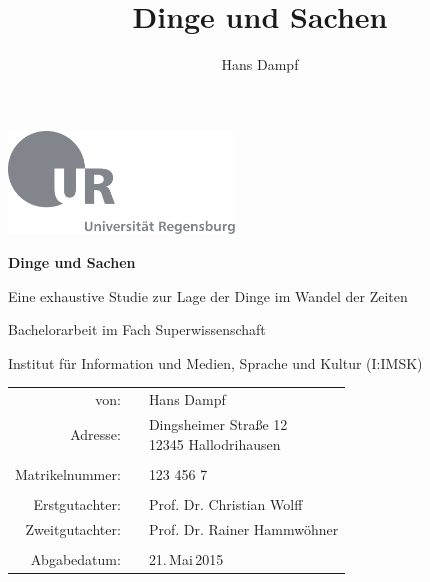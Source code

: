 \documentclass[12pt,ngerman,a4paper,DIV=9,headinclude=true,footinclude=false,titlepage=true,headsepline=true,toc=bibliography,toc=listof]{scrartcl}
\title{Dinge und Sachen\\\vspace{0.5em}{\large Eine exhaustive Studie zur Lage der Dinge im Wandel der Zeiten}}
\author{Hans Dampf}
\makeatletter
\newif \if@mainmatter \@mainmattertrue
\newcommand*\frontmatter{\clearpage\thispagestyle{plain}\@mainmatterfalse\pagenumbering{roman}}
\makeatother
\begin{document}
\frontmatter
\begin{titlepage}
  \begin{center}

  \hbox{\hspace{2.74cm}\includegraphics[width=0.45\textwidth]{Template/UR-Logo/ur-logo-mit-text.pdf}}

  \vspace{1.8cm}

  {\huge\textbf{Dinge und Sachen}}

    \vspace{0.8cm}
  {\large{Eine exhaustive Studie zur Lage der Dinge im Wandel der Zeiten}}
  
  \vspace{1.5cm}

    Bachelorarbeit im Fach Superwissenschaft
  
    Institut für Information und Medien, Sprache und Kultur (I:IMSK)
  
  \vspace{0.8cm}
  \begin{center}
  \begin{tabular}{ r c l }
  von:             &  & Hans Dampf                                     \\
  Adresse:         &  & \parbox[t]{4cm}{ Dingsheimer Straße 12 \\ 12345 Hallodrihausen }  \\
                   &  &                                              \\
  Matrikelnummer:  &  & 123 456 7                                \\
                   &  &                                              \\
  Erstgutachter:   &  & Prof. Dr. Christian Wolff                                 \\
  Zweitgutachter:  &  & Prof. Dr. Rainer Hammwöhner                                \\
                   &  &                                              \\
  Abgabedatum:     &  & 21.\,Mai\,2015
  \end{tabular}
  \end{center}
  \end{center}
\end{titlepage}
\end{document}
